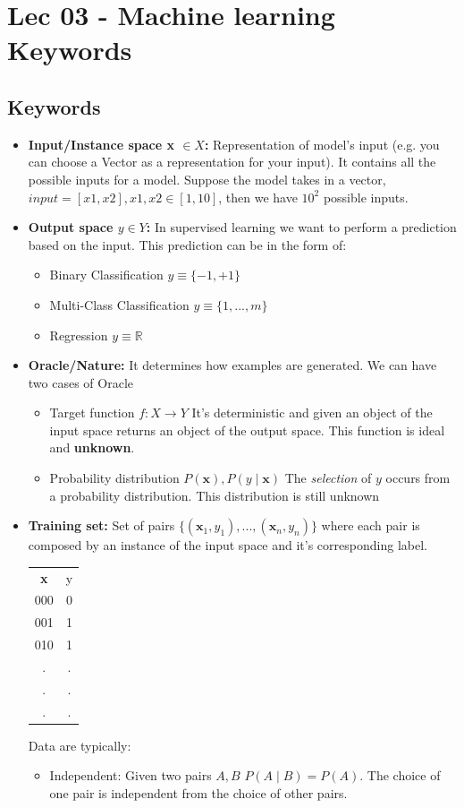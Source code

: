 \chapter{Lec 03 - Machine learning Keywords}

\section{Keywords}
\begin{itemize}
\item \textbf{Input/Instance space x $\in X$:}
Representation of model's input (e.g. you can choose a Vector as a representation for your input). It contains all the possible inputs for a model. Suppose the model takes in a vector, $input = [x1, x2], x1,x2 \in [1,10]$, then we have $10^2$ possible inputs.
\item \textbf{Output space $y \in Y$:}
In supervised learning we want to perform a prediction based on the input. This prediction can be in the form of:
\begin{itemize}
    \item Binary Classification $y \equiv \{-1, +1\}$
    \item Multi-Class Classification $y \equiv \{1,...,m\}$
    \item Regression $y \equiv \mathbb{R}$
\end{itemize}
\item \textbf{Oracle/Nature:}
It determines how examples are generated. We can have two cases of Oracle
\begin{itemize}
    \item Target function $f: X \rightarrow Y$ It's deterministic and given an object of the input space returns an object of the output space. This function is ideal and \textbf{unknown}.
    \item Probability distribution $P(\textbf{x}), P(y\mid\textbf{x})$ The \textit{selection} of $y$ occurs from a probability distribution. This distribution is still unknown
\end{itemize}
\item \textbf{Training set:}
Set of pairs $\{(\textbf{x}_{1}, y_{1}), ..., (\textbf{x}_{n}, y_{n}) \}$ where each pair is composed by an instance of the input space and it's corresponding label.
\begin{center}
    \begin{tabular}{c|c}
     \textbf{x} & y\\
     000&0  \\
     001&1 \\
     010&1 \\
     .&. \\
     .&. \\
     .&.\\
    \end{tabular}
\end{center}
Data are typically:
\begin{itemize}
    \item Independent: Given two pairs $A,B$ $P(A \mid B) = P(A)$. The choice of one pair is independent from the choice of other pairs.
    

\end{itemize}
\end{itemize}
